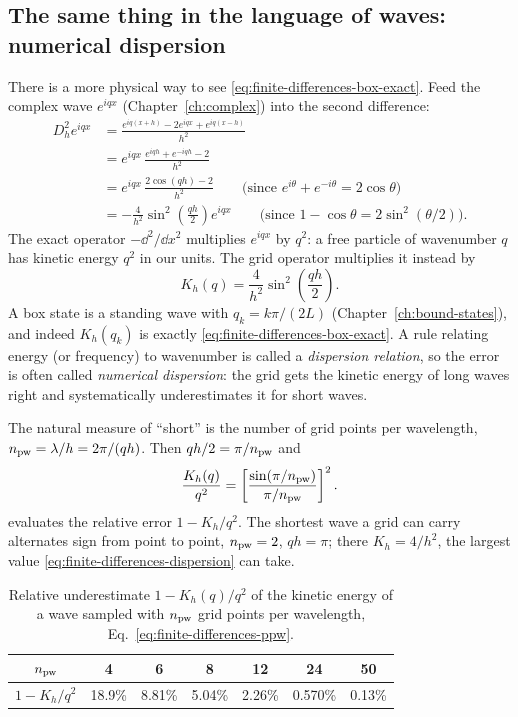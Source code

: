 \subsection{The same thing in the language of waves: numerical dispersion}

There is a more physical way to see \eqref{eq:finite-differences-box-exact}. Feed the complex wave $e^{iqx}$ (Chapter~\ref{ch:complex}) into the second difference:
\begin{align*}
D_h^2e^{iqx}&=\frac{e^{iq(x+h)}-2e^{iqx}+e^{iq(x-h)}}{h^2}\\
&=e^{iqx}\,\frac{e^{iqh}+e^{-iqh}-2}{h^2}\\
&=e^{iqx}\,\frac{2\cos(qh)-2}{h^2}\qquad\text{(since }e^{i\theta}+e^{-i\theta}=2\cos\theta\text{)}\\
&=-\frac{4}{h^2}\sin^2\!\left(\frac{qh}{2}\right)e^{iqx}\qquad\text{(since }1-\cos\theta=2\sin^2(\theta/2)\text{)}.
\end{align*}
The exact operator $-\dd^2/\dd x^2$ multiplies $e^{iqx}$ by $q^2$: a free particle of wavenumber $q$ has kinetic energy $q^2$ in our units. The grid operator multiplies it instead by
\begin{equation}
K_h(q)=\frac{4}{h^2}\sin^2\!\left(\frac{qh}{2}\right).
\label{eq:finite-differences-dispersion}
\end{equation}
A box state is a standing wave with $q_k=k\pi/(2L)$ (Chapter~\ref{ch:bound-states}), and indeed $K_h(q_k)$ is exactly \eqref{eq:finite-differences-box-exact}. A rule relating energy (or frequency) to wavenumber is called a \emph{dispersion relation}, so the error is often called \emph{numerical dispersion}: the grid gets the kinetic energy of long waves right and systematically underestimates it for short waves.

The natural measure of ``short'' is the number of grid points per wavelength, $n_{\rm pw}=\lambda/h=2\pi/(qh)$. Then $qh/2=\pi/n_{\rm pw}$ and
\begin{equation}
\frac{K_h(q)}{q^2}=\left[\frac{\sin(\pi/n_{\rm pw})}{\pi/n_{\rm pw}}\right]^2.
\label{eq:finite-differences-ppw}
\end{equation}
 evaluates the relative error $1-K_h/q^2$. The shortest wave a grid can carry alternates sign from point to point, $n_{\rm pw}=2$, $qh=\pi$; there $K_h=4/h^2$, the largest value \eqref{eq:finite-differences-dispersion} can take.

\begin{table}[htbp]\centering
\caption{Relative underestimate $1-K_h(q)/q^2$ of the kinetic energy of a wave sampled with $n_{\rm pw}$ grid points per wavelength, Eq.~\eqref{eq:finite-differences-ppw}.}
\label{tab:finite-differences-ppw}
\begin{tabular}{ccccccc}
\toprule
$n_{\rm pw}$ & 4 & 6 & 8 & 12 & 24 & 50\\
\midrule
$1-K_h/q^2$ & 18.9\% & 8.81\% & 5.04\% & 2.26\% & 0.570\% & 0.13\%\\
\bottomrule
\end{tabular}
\end{table}

